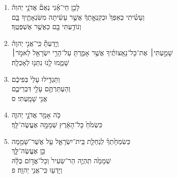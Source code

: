 \documentclass[12pt,a4paper,titlepage]{article}
\def \pslabelsep{-0.9em} %
\def \psleftmargin{0em} %
\begin{document}
\begin{enumerate}[leftmargin=\psleftmargin, labelsep = \pslabelsep, label={\arabic*}, font=\color{\pscolor}\small\textsuperscript, parsep=0em, itemsep=0em, topsep=0em ]
\item \texthebrew{לָכֵ֣ן חַי־אָ֗נִי נְאֻם֘ אֲדֹנָ֣י יְהוִה֒ \\ וְעָשִׂ֗יתִי כְּאַפְּךָ֙ וּכְקִנְאָ֣תְךָ֔ אֲשֶׁ֣ר עָשִׂ֔יתָה מִשִּׂנְאָתֶ֖יךָ בָּ֑ם \\ וְנוֹדַ֥עְתִּי בָ֖ם כַּאֲשֶׁ֥ר אֶשְׁפְּטֶֽךָ׃}
\item \texthebrew{וְֽיָדַעְתָּ֘ כִּֽי־אֲנִ֣י יְהוָה֒ \\ שָׁמַ֣עְתִּי׀ אֶת־כָּל־נָאָֽצוֹתֶ֗יךָ אֲשֶׁ֥ר אָמַ֛רְתָּ עַל־הָרֵ֥י יִשְׂרָאֵ֖ל לֵאמֹ֣ר׀ \\ שָׁמֵ֑מוּ לָ֥נוּ נִתְּנ֖וּ לְאָכְלָֽה׃}
\item \texthebrew{וַתַּגְדִּ֤ילוּ עָלַי֙ בְּפִיכֶ֔ם \\ וְהַעְתַּרְתֶּ֥ם עָלַ֖י דִּבְרֵיכֶ֑ם \\ אֲנִ֖י שָׁמָֽעְתִּי׃ ס} \parSpace

\item \texthebrew{כֹּ֥ה אָמַ֖ר אֲדֹנָ֣י יְהוִ֑ה \\ כִּשְׂמֹ֙חַ֙ כָּל־הָאָ֔רֶץ שְׁמָמָ֖ה אֶעֱשֶׂה־לָּֽךְ׃}
\item \texthebrew{כְּשִׂמְחָ֙תְךָ֜ לְנַחְלַ֧ת בֵּֽית־יִשְׂרָאֵ֛ל עַ֥ל אֲשֶׁר־שָׁמֵ֖מָה \\ כֵּ֣ן אֶעֱשֶׂה־לָּ֑ךְ \\ שְׁמָמָ֙ה תִֽהְיֶ֤ה הַר־שֵׂעִיר֙ וְכָל־אֱד֣וֹם כֻּלָּ֔הּ \\ וְיָדְע֖וּ כִּֽי־אֲנִ֥י יְהוָֽה׃ פ}
\end{enumerate}
\newpage

\end{document}
